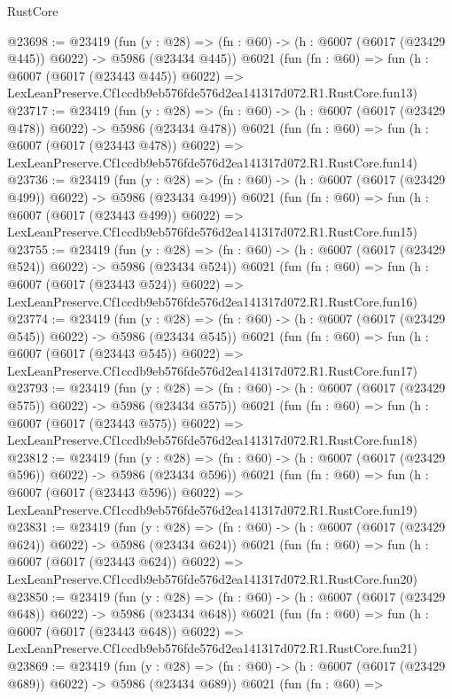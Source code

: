 \begin{lexlean}{RustCore}
\begin{coremodule}
@23698 := @23419
    (fun (y : @28) => (fn : @60) -> (h : @6007 (@6017 (@23429 @445)) @6022) -> @5986 (@23434 @445))
    @6021
    (fun (fn : @60) =>
    fun (h : @6007 (@6017 (@23443 @445)) @6022) =>
    LexLeanPreserve.Cf1ccdb9eb576fde576d2ea141317d072.R1.RustCore.fun13)
@23717 := @23419
    (fun (y : @28) => (fn : @60) -> (h : @6007 (@6017 (@23429 @478)) @6022) -> @5986 (@23434 @478))
    @6021
    (fun (fn : @60) =>
    fun (h : @6007 (@6017 (@23443 @478)) @6022) =>
    LexLeanPreserve.Cf1ccdb9eb576fde576d2ea141317d072.R1.RustCore.fun14)
@23736 := @23419
    (fun (y : @28) => (fn : @60) -> (h : @6007 (@6017 (@23429 @499)) @6022) -> @5986 (@23434 @499))
    @6021
    (fun (fn : @60) =>
    fun (h : @6007 (@6017 (@23443 @499)) @6022) =>
    LexLeanPreserve.Cf1ccdb9eb576fde576d2ea141317d072.R1.RustCore.fun15)
@23755 := @23419
    (fun (y : @28) => (fn : @60) -> (h : @6007 (@6017 (@23429 @524)) @6022) -> @5986 (@23434 @524))
    @6021
    (fun (fn : @60) =>
    fun (h : @6007 (@6017 (@23443 @524)) @6022) =>
    LexLeanPreserve.Cf1ccdb9eb576fde576d2ea141317d072.R1.RustCore.fun16)
@23774 := @23419
    (fun (y : @28) => (fn : @60) -> (h : @6007 (@6017 (@23429 @545)) @6022) -> @5986 (@23434 @545))
    @6021
    (fun (fn : @60) =>
    fun (h : @6007 (@6017 (@23443 @545)) @6022) =>
    LexLeanPreserve.Cf1ccdb9eb576fde576d2ea141317d072.R1.RustCore.fun17)
@23793 := @23419
    (fun (y : @28) => (fn : @60) -> (h : @6007 (@6017 (@23429 @575)) @6022) -> @5986 (@23434 @575))
    @6021
    (fun (fn : @60) =>
    fun (h : @6007 (@6017 (@23443 @575)) @6022) =>
    LexLeanPreserve.Cf1ccdb9eb576fde576d2ea141317d072.R1.RustCore.fun18)
@23812 := @23419
    (fun (y : @28) => (fn : @60) -> (h : @6007 (@6017 (@23429 @596)) @6022) -> @5986 (@23434 @596))
    @6021
    (fun (fn : @60) =>
    fun (h : @6007 (@6017 (@23443 @596)) @6022) =>
    LexLeanPreserve.Cf1ccdb9eb576fde576d2ea141317d072.R1.RustCore.fun19)
@23831 := @23419
    (fun (y : @28) => (fn : @60) -> (h : @6007 (@6017 (@23429 @624)) @6022) -> @5986 (@23434 @624))
    @6021
    (fun (fn : @60) =>
    fun (h : @6007 (@6017 (@23443 @624)) @6022) =>
    LexLeanPreserve.Cf1ccdb9eb576fde576d2ea141317d072.R1.RustCore.fun20)
@23850 := @23419
    (fun (y : @28) => (fn : @60) -> (h : @6007 (@6017 (@23429 @648)) @6022) -> @5986 (@23434 @648))
    @6021
    (fun (fn : @60) =>
    fun (h : @6007 (@6017 (@23443 @648)) @6022) =>
    LexLeanPreserve.Cf1ccdb9eb576fde576d2ea141317d072.R1.RustCore.fun21)
@23869 := @23419
    (fun (y : @28) => (fn : @60) -> (h : @6007 (@6017 (@23429 @689)) @6022) -> @5986 (@23434 @689))
    @6021
    (fun (fn : @60) =>

\end{coremodule}
\end{lexlean}
